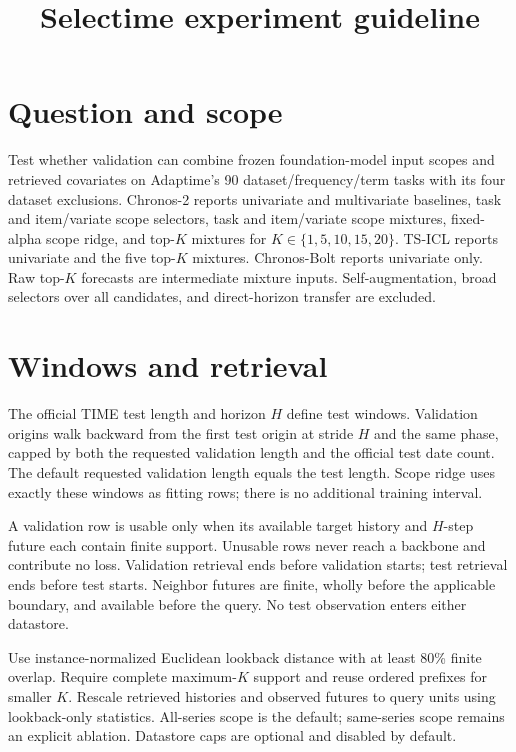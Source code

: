 \documentclass[11pt]{article}
\title{Selectime experiment guideline}
\author{}
\date{}
\begin{document}
\maketitle

\section{Question and scope}
Test whether validation can combine frozen foundation-model input scopes and
retrieved covariates on Adaptime's 90 dataset/frequency/term tasks with its four
dataset exclusions. Chronos-2 reports univariate and multivariate baselines,
task and item/variate scope selectors, task and item/variate scope mixtures,
fixed-alpha scope ridge, and top-$K$ mixtures for
$K\in\{1,5,10,15,20\}$. TS-ICL reports univariate and the five top-$K$
mixtures. Chronos-Bolt reports univariate only. Raw top-$K$ forecasts are
intermediate mixture inputs. Self-augmentation, broad selectors over all
candidates, and direct-horizon transfer are excluded.

\section{Windows and retrieval}
The official TIME test length and horizon $H$ define test windows. Validation
origins walk backward from the first test origin at stride $H$ and the same
phase, capped by both the requested validation length and the official test
date count. The default requested validation length equals the test length.
Scope ridge uses exactly these windows as fitting rows; there is no additional
training interval.

A validation row is usable only when its available target history and $H$-step
future each contain finite support. Unusable rows never reach a backbone and
contribute no loss. Validation retrieval ends before validation starts; test
retrieval ends before test starts. Neighbor futures are finite, wholly before
the applicable boundary, and available before the query. No test observation
enters either datastore.

Use instance-normalized Euclidean lookback distance with at least 80\% finite
overlap. Require complete maximum-$K$ support and reuse ordered prefixes for
smaller $K$. Rescale retrieved histories and observed futures to query units
using lookback-only statistics. All-series scope is the default; same-series
scope remains an explicit ablation. Datastore caps are optional and disabled
by default.
\end{document}
